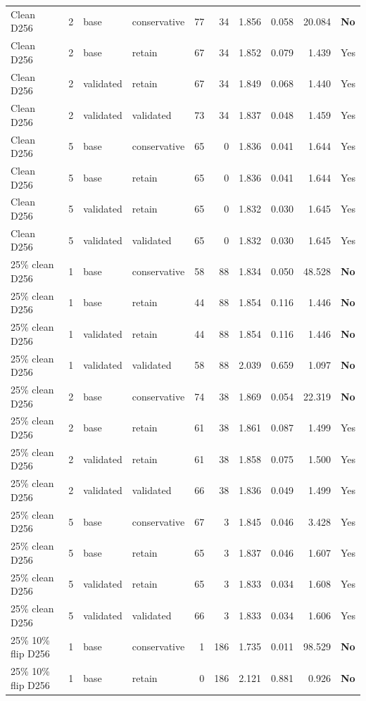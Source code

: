 {\begin{longtable}{llllrrrrrl}
Clean D256 & 2 & base & conservative & 77 & 34 & 1.856 & 0.058 & 20.084 & \textbf{No}\\
Clean D256 & 2 & base & retain & 67 & 34 & 1.852 & 0.079 & 1.439 & Yes\\
Clean D256 & 2 & validated & retain & 67 & 34 & 1.849 & 0.068 & 1.440 & Yes\\
Clean D256 & 2 & validated & validated & 73 & 34 & 1.837 & 0.048 & 1.459 & Yes\\
Clean D256 & 5 & base & conservative & 65 & 0 & 1.836 & 0.041 & 1.644 & Yes\\
Clean D256 & 5 & base & retain & 65 & 0 & 1.836 & 0.041 & 1.644 & Yes\\
Clean D256 & 5 & validated & retain & 65 & 0 & 1.832 & 0.030 & 1.645 & Yes\\
Clean D256 & 5 & validated & validated & 65 & 0 & 1.832 & 0.030 & 1.645 & Yes\\
25\% clean D256 & 1 & base & conservative & 58 & 88 & 1.834 & 0.050 & 48.528 & \textbf{No}\\
25\% clean D256 & 1 & base & retain & 44 & 88 & 1.854 & 0.116 & 1.446 & \textbf{No}\\
25\% clean D256 & 1 & validated & retain & 44 & 88 & 1.854 & 0.116 & 1.446 & \textbf{No}\\
25\% clean D256 & 1 & validated & validated & 58 & 88 & 2.039 & 0.659 & 1.097 & \textbf{No}\\
25\% clean D256 & 2 & base & conservative & 74 & 38 & 1.869 & 0.054 & 22.319 & \textbf{No}\\
25\% clean D256 & 2 & base & retain & 61 & 38 & 1.861 & 0.087 & 1.499 & Yes\\
25\% clean D256 & 2 & validated & retain & 61 & 38 & 1.858 & 0.075 & 1.500 & Yes\\
25\% clean D256 & 2 & validated & validated & 66 & 38 & 1.836 & 0.049 & 1.499 & Yes\\
25\% clean D256 & 5 & base & conservative & 67 & 3 & 1.845 & 0.046 & 3.428 & Yes\\
25\% clean D256 & 5 & base & retain & 65 & 3 & 1.837 & 0.046 & 1.607 & Yes\\
25\% clean D256 & 5 & validated & retain & 65 & 3 & 1.833 & 0.034 & 1.608 & Yes\\
25\% clean D256 & 5 & validated & validated & 66 & 3 & 1.833 & 0.034 & 1.606 & Yes\\
25\% 10\% flip D256 & 1 & base & conservative & 1 & 186 & 1.735 & 0.011 & 98.529 & \textbf{No}\\
25\% 10\% flip D256 & 1 & base & retain & 0 & 186 & 2.121 & 0.881 & 0.926 & \textbf{No}\\

\end{longtable}}

